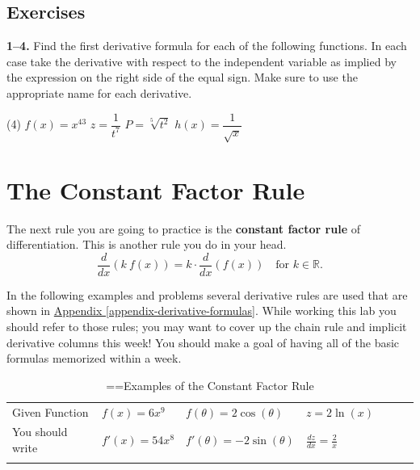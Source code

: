 \documentclass[10pt,oneside,]{book}
\newcommand{\terminology}[1]{\textbf{#1}}
\theoremstyle{plain}
\theoremstyle{definition}
\numberwithin{equation}{section}
\newcommand{\hrulethin}  {\noalign{\hrule height 0.04em}}
\newcommand{\hrulethick} {\noalign{\hrule height 0.11em}}
\newcommand{\reals}{\mathbb{R}}
\newcommand{\fe}[2]{#1\mathopen{}\left(#2\right)\mathclose{}}
\newcommand{\fd}[1]{#1'}
\newcommand{\lz}[2]{\frac{d#1}{d#2}}
\newcommand{\lzoo}[2]{{\frac{d}{d#1}}{\left(#2\right)}}
\begin{document}
\subsection[Exercises]{Exercises}\label{exercises-33}
\textbf{1--4. }\hypertarget{exercisegroup-72}{\null}Find the first derivative formula for each of the following functions.  In each case take the derivative with respect to the independent variable as implied by the expression on the right side of the equal sign.  Make sure to use the appropriate name for each derivative.%
\par
\begin{exercisegroup}(4)
\exercise[1.]\hypertarget{exercise-354}{\null}\(\fe{f}{x}=x^{43}\)%
\exercise[2.]\hypertarget{exercise-355}{\null}\(z=\dfrac{1}{t^{7}}\)%
\exercise[3.]\hypertarget{exercise-356}{\null}\(P=\sqrt[5]{t^2}\)%
\exercise[4.]\hypertarget{exercise-357}{\null}\(\fe{h}{x}=\dfrac{1}{\sqrt{x}}\)%
\end{exercisegroup}
\par\smallskip\noindent
\typeout{************************************************}
\typeout{************************************************}
\section[The Constant Factor Rule]{The Constant Factor Rule}\label{section-constant-factor-rule}
The next rule you are going to practice is the \terminology{constant factor rule} of differentiation.  This is another rule you do in your head. \begin{equation}\lzoo{x}{k\ \fe{f}{x}}=k\cdot\lzoo{x}{\fe{f}{x}}\quad\text{for }k\in\reals\text{.}\label{men-3}\end{equation}%
\par
In the following examples and problems several derivative rules are used that are shown in \hyperref[appendix-derivative-formulas]{Appendix \ref{appendix-derivative-formulas}}.  While working this lab you should refer to those rules; you may want to cover up the chain rule and implicit derivative columns this week!  You should make a goal of having all of the basic formulas memorized within a week.%
\begin{table}
\centering
\caption{\binoppenalty=\maxdimen \relpenalty=\maxdimen Examples of the Constant Factor Rule\label{table-constant-factor-rule}}
\begin{tabular}{lAlAlAl}\hrulethick
Given Function&\(\fe{f}{x}=6x^9\)&\(\fe{f}{\theta}=2\fe{\cos}{\theta}\)&\(z=2\fe{\ln}{x}\)\\\hrulethin
You should write&\(\fe{\fd{f}}{x}=54x^8\)&\(\fe{\fd{f}}{\theta}=-2\fe{\sin}{\theta}\)&\(\lz{z}{x}=\frac{2}{x}\)\\\hrulethick
\end{tabular}
\end{table}
\typeout{************************************************}
\typeout{************************************************}
\end{document}
